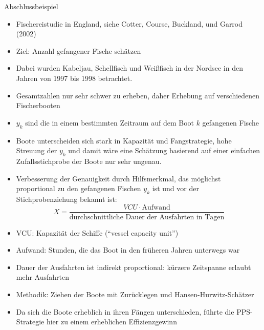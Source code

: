 \documentclass[9pt]{beamer}
\begin{document}
\begin{frame}{Abschlussbeispiel}\footnotesize
\begin{itemize}
	\item Fischereistudie in England, siehe Cotter, Course, Buckland, und Garrod (2002)
	\item Ziel: Anzahl gefangener Fische schätzen
	\item Dabei wurden Kabeljau, Schellfisch und Weißfisch in der Nordsee in den Jahren von 1997 bis 1998	betrachtet. 
	\item Gesamtzahlen nur sehr schwer zu erheben, daher Erhebung auf verschiedenen Fischerbooten
	\item $y_k$ sind die in einem bestimmten Zeitraum auf dem Boot $k$ gefangenen Fische	
	\item Boote unterscheiden sich stark in Kapazität und Fangstrategie, hohe Streuung der $y_k$ und damit wäre eine Schätzung basierend auf einer einfachen Zufallsstichprobe der Boote nur sehr ungenau. 
	\item Verbesserung der Genauigkeit durch Hilfsmerkmal, das möglichst proportional zu den gefangenen Fischen $y_k$ ist und vor der Stichprobenziehung bekannt ist:
	$$X = \frac{VCU \cdot \text{Aufwand}}{\text{durchschnittliche Dauer der Ausfahrten in Tagen}}$$
   \item VCU: Kapazität der Schiffe (\enquote{vessel capacity unit})
	\item Aufwand: Stunden, die das Boot in den früheren Jahren unterwegs war
	\item Dauer der Ausfahrten ist indirekt proportional: kürzere Zeitspanne erlaubt mehr Ausfahrten
	\item Methodik: Ziehen der Boote mit Zurücklegen und Hansen-Hurwitz-Schätzer
	\item Da sich die Boote erheblich in ihren Fängen unterschieden, führte die PPS-Strategie hier zu einem erheblichen Effizienzgewinn
\end{itemize}

\end{frame}
\end{document}
